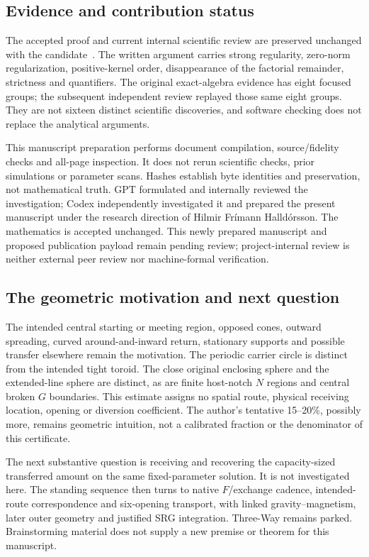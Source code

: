 \subsection{Evidence and contribution status}\label{sec:evidence}
The accepted proof and current internal scientific review are preserved unchanged with the candidate~\cite{fa,fareview}. The written argument carries strong regularity, zero-norm regularization, positive-kernel order, disappearance of the factorial remainder, strictness and quantifiers. The original exact-algebra evidence has eight focused groups; the subsequent independent review replayed those same eight groups. They are not sixteen distinct scientific discoveries, and software checking does not replace the analytical arguments.

This manuscript preparation performs document compilation, source/fidelity checks and all-page inspection. It does not rerun scientific checks, prior simulations or parameter scans. Hashes establish byte identities and preservation, not mathematical truth. GPT formulated and internally reviewed the investigation; Codex independently investigated it and prepared the present manuscript under the research direction of Hilmir Fr\'imann Halld\'orsson. The mathematics is accepted unchanged. This newly prepared manuscript and proposed publication payload remain pending review; project-internal review is neither external peer review nor machine-formal verification.

\subsection{The geometric motivation and next question}\label{sec:outlook}
The intended central starting or meeting region, opposed cones, outward spreading, curved around-and-inward return, stationary supports and possible transfer elsewhere remain the motivation. The periodic carrier circle is distinct from the intended tight toroid. The close original enclosing sphere and the extended-line sphere are distinct, as are finite host-notch $N$ regions and central broken $G$ boundaries. This estimate assigns no spatial route, physical receiving location, opening or diversion coefficient. The author's tentative 15--20\%, possibly more, remains geometric intuition, not a calibrated fraction or the denominator of this certificate.

The next substantive question is receiving and recovering the capacity-sized transferred amount on the same fixed-parameter solution. It is not investigated here. The standing sequence then turns to native $F$/exchange cadence, intended-route correspondence and six-opening transport, with linked gravity--magnetism, later outer geometry and justified SRG integration. Three-Way remains parked. Brainstorming material does not supply a new premise or theorem for this manuscript.
